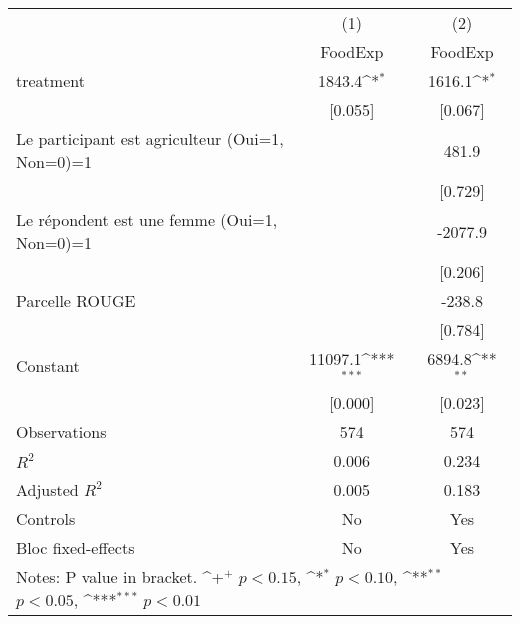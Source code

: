 {
\def\sym#1{\ifmmode^{#1}\else\(^{#1}\)\fi}
\begin{tabular*}{1.2\hsize}{@{\hskip\tabcolsep\extracolsep\fill}l*{2}{c}}
\cline{2-3}\cline{2-3}
     &\multicolumn{1}{c}{(1)}&\multicolumn{1}{c}{(2)}\\
     &\multicolumn{1}{c}{FoodExp}&\multicolumn{1}{c}{FoodExp}\\
\cline{2-3}
treatment&1843.4\sym{*}  &1616.1\sym{*}  \\
     &[0.055]         &[0.067]         \\
[1em]
Le participant est agriculteur (Oui=1, Non=0)=1&           &481.9         \\
     &           &[0.729]         \\
[1em]
Le répondent est une femme (Oui=1, Non=0)=1&           &-2077.9         \\
     &           &[0.206]         \\
[1em]
Parcelle ROUGE&           &-238.8         \\
     &           &[0.784]         \\
[1em]
Constant&11097.1\sym{***}&6894.8\sym{**} \\
     &[0.000]         &[0.023]         \\
\cline{2-3}
Observations&574         &574         \\
\(R^{2}\)&0.006         &0.234         \\
Adjusted \(R^{2}\)&0.005         &0.183         \\
Controls&No         &Yes         \\
Bloc fixed-effects&No         &Yes         \\
\cline{2-3}\cline{2-3}
\multicolumn{3}{p{1.0\textwidth}}{\footnotesize Notes: P value in bracket. \sym{+} \(p<0.15\), \sym{*} \(p<0.10\), \sym{**} \(p<0.05\), \sym{***} \(p<0.01\)}\\
\end{tabular*}
}
